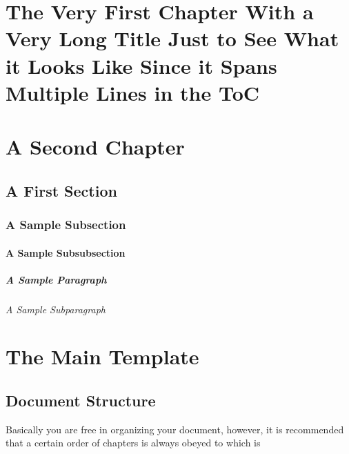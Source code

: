 \chapter[The Short Title of the Chapter Showing Up in the TOC and the Page Headers]{The Very First Chapter With a Very Long Title Just to See What it Looks Like Since it Spans Multiple Lines in the ToC}

\lipsum[1]

\chapter{A Second Chapter}

\lipsum[1]

\section{A First Section}

\lipsum[1]

\subsection{A Sample Subsection}

\lipsum[1]

\subsubsection{A Sample Subsubsection}

\lipsum[1]

\paragraph{A Sample Paragraph}
\lipsum[1]

\subparagraph{A Sample Subparagraph}
\lipsum[1]


\chapter{The Main Template}

\section{Document Structure}

Basically you are free in organizing your document, however, it is recommended that a certain order of chapters is always obeyed to which is

